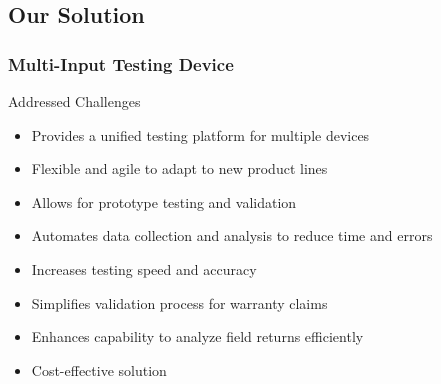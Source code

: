 \documentclass[8pt,compress,aspectratio=169]{beamer}
\begin{document}
\subsection{Our Solution}
\begin{frame}
    \frametitle{Multi-Input Testing Device}
    \begin{block}{Addressed Challenges}
        \begin{itemize}
            \item Provides a unified testing platform for multiple devices
            \item Flexible and agile to adapt to new product lines
            \item Allows for prototype testing and validation
            \item Automates data collection and analysis to reduce time and errors
            \item Increases testing speed and accuracy
            \item Simplifies validation process for warranty claims
            \item Enhances capability to analyze field returns efficiently
            \item Cost-effective solution
        \end{itemize}
    \end{block}
\end{frame}
\end{document}
